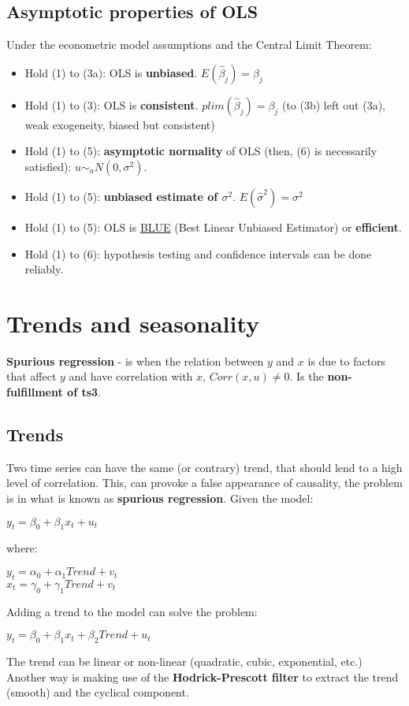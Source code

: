 \documentclass[10pt, a4paper, landscape]{extarticle}
\begin{document}
\begin{multicols}{3}
	\subsection*{Asymptotic properties of OLS}
		Under the econometric model assumptions and the Central Limit Theorem:
		\begin{itemize}[leftmargin=*]
			\item Hold (1) to (3a): OLS is \textbf{unbiased}. $E(\hat{\beta}_j) = \beta_j$
			\item Hold (1) to (3): OLS is \textbf{consistent}. $plim(\hat{\beta}_j) = \beta_j$ (to (3b) left out (3a), weak exogeneity, biased but consistent)
			\item Hold (1) to (5): \textbf{asymptotic normality} of OLS (then, (6) is necessarily satisfied): $u \sim_a N(0,\sigma^2)$.
			\item Hold (1) to (5): \textbf{unbiased estimate of $\sigma^2$}. $E(\hat{\sigma}^2) = \sigma^2$
			\item Hold (1) to (5): OLS is \textcolor{blue}{\href{https://www.youtube.com/watch?v=68ugkg9RePc}{BLUE}} (Best Linear Unbiased Estimator) or \textbf{efficient}. 
			\item Hold (1) to (6): hypothesis testing and confidence intervals can be done reliably.
		\end{itemize}

\columnbreak

\section*{Trends and seasonality}
	\textbf{Spurious regression} - is when the relation between $y$ and $x$ is due to factors that affect $y$ and have correlation with $x$, $Corr(x, u) \neq 0$. Is the \textbf{non-fulfillment of ts3}.
	\subsection*{Trends}
		Two time series can have the same (or contrary) trend, that should lend to a high level of correlation. This, can provoke a false appearance of causality, the problem is in what is known as \textbf{spurious regression}. Given the model:
		\begin{center}
			$y_t = \beta_0 + \beta_1 x_t + u_t$
		\end{center}
		where:
		\begin{center}
			$y_t = \alpha_0 + \alpha_1 Trend + v_t$
			\\ $x_t = \gamma_0 + \gamma_1 Trend + v_t$
		\end{center}
		Adding a trend to the model can solve the problem:
		\begin{center}
			$y_t = \beta_0 + \beta_1 x_t + \beta_2 Trend + u_t$
		\end{center}
		The trend can be linear or non-linear (quadratic, cubic, exponential, etc.)
		\\ Another way is making use of the \textbf{Hodrick-Prescott filter} to extract the trend (smooth) and the cyclical component.

\end{multicols}
\end{document}
